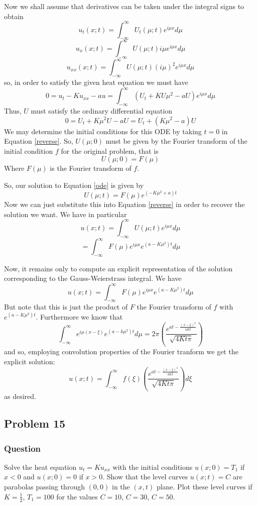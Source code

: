 \documentclass[12pt]{article}
\begin{document}
Now we shall assume that derivatives can be taken under the integral signs to obtain 
\[u_t(x;t)=\int_{-\infty}^\infty U_t(\mu;t) e^{i \mu x} d\mu\]
\[u_x(x;t)=\int_{-\infty}^\infty U(\mu;t) i \mu e^{i \mu x} d\mu\]
\[u_{xx}(x;t)=\int_{-\infty}^\infty U(\mu;t) (i\mu)^2 e^{i \mu x} d\mu\]
so, in order to satisfy the given heat equation we must have
\[0=u_t-Ku_{xx}-au=\int_{-\infty}^\infty \left( U_t + K U\mu^2 -aU \right) e^{i \mu x} d\mu\]
Thus, $U$ must satisfy the ordinary differential equation 
\begin{equation}\label{ode}0=U_t+K\mu^2U-aU=U_t+(K\mu^2-a)U\end{equation}
We may determine the initial conditions for this ODE by taking $t=0$ in Equation \ref{reverse}. So, $U(\mu;0)$ must be given by the Fourier transform of the initial condition $f$ for the original problem, that is
\[U(\mu;0)=F(\mu)\]
Where $F(\mu)$ is the Fourier transform of $f$.

So, our solution to Equation \ref{ode} is given by 
\[U(\mu;t)=F(\mu)e^{(-K\mu^2+a)t}\]
Now we can just substitute this into Equation \ref{reverse} in order to recover the solution we want. We have in particular
\[u(x;t)=\int_{-\infty}^\infty U(\mu;t)e^{i \mu x} d\mu \]
\[=\int_{-\infty}^\infty F(\mu) e^{i\mu x}e^{(a-K \mu^2)t}d\mu \]

Now, it remains only to compute an explicit representation of the solution corresponding to the Gauss-Weierstrass integral. We have 
\[u(x;t)=\int_{-\infty}^\infty F(\mu) e^{i\mu x}e^{(a-K \mu^2)t}d\mu \]
But note that this is just the product of $F$ the Fourier transform of $f$ with $e^{(a-K\mu^2)t}$. Furthermore we know that
\[\int_{-\infty}^\infty e^{i\mu(x-\xi)}e^{(a-k\mu^2)t}d\mu=2\pi \left( \frac{e^{at-\frac{(x-\xi)^2}{4Kt}}}{\sqrt{4 K t \pi}} \right) \]
and so, employing convolution properties of the Fourier tranform \cite[Theorem 5.2]{pinsky} we get the explicit solution:
\[u(x;t)=\int_{-\infty}^\infty f(\xi) \left( \frac{e^{at-\frac{(x-\xi)^2}{4Kt}}}{\sqrt{4 K t \pi}} \right) d \xi \]
as desired.

\subsection{Problem 15}
\subsubsection{Question}

Solve the heat equation $u_t=Ku_{xx}$ with the initial conditions $u(x;0)=T_1$ if $x<0$ and $u(x;0)=0$ if $x>0$. Show that the level curves $u(x;t)=C$ are parabolas passing through $(0,0)$ in the $(x,t)$ plane. Plot these level curves if $K=\frac{1}{2}$, $T_1=100$ for the values $C=10$, $C=30$, $C=50$.
\end{document}
